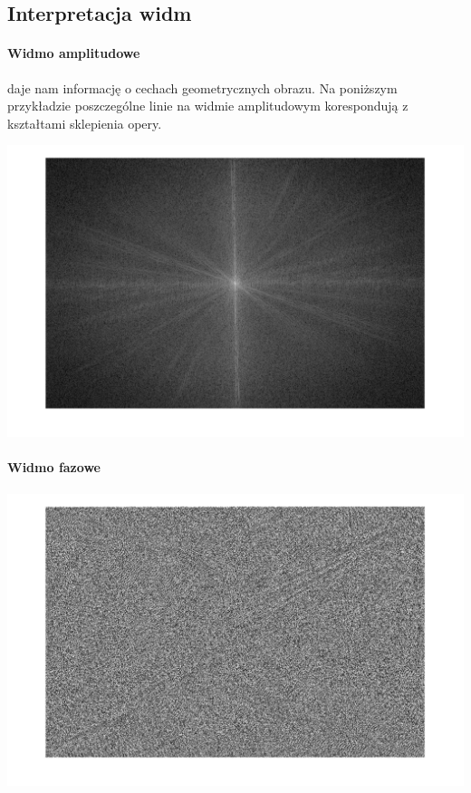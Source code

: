 \documentclass{article}
\begin{document}
	\subsection{Interpretacja widm}
	\paragraph{Widmo amplitudowe}
	daje nam informację o cechach geometrycznych obrazu. Na poniższym przykładzie poszczególne linie na widmie amplitudowym korespondują z kształtami sklepienia opery.
	\begin{center}
		\includegraphics[width=\linewidth]{../../lab04/amplitude_spectrum.png}
	\end{center}
	\paragraph{Widmo fazowe}
	\begin{center}
		\includegraphics[width=\linewidth]{../../lab04/angle_spectrum.png}
	\end{center}
	
\end{document}
